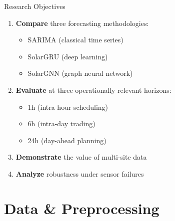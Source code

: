 \documentclass[aspectratio=169,11pt]{beamer}
\begin{document}
\begin{frame}{Research Objectives}
\begin{enumerate}
    \item \textbf{Compare} three forecasting methodologies:
    \begin{itemize}
        \item SARIMA (classical time series)
        \item SolarGRU (deep learning)
        \item SolarGNN (graph neural network)
    \end{itemize}
    
    \vspace{0.3cm}
    \item \textbf{Evaluate} at three operationally relevant horizons:
    \begin{itemize}
        \item 1h (intra-hour scheduling)
        \item 6h (intra-day trading)
        \item 24h (day-ahead planning)
    \end{itemize}
    
    \vspace{0.3cm}
    \item \textbf{Demonstrate} the value of multi-site data
    
    \vspace{0.3cm}
    \item \textbf{Analyze} robustness under sensor failures
\end{enumerate}
\end{frame}

\section{Data \& Preprocessing}
\end{document}
